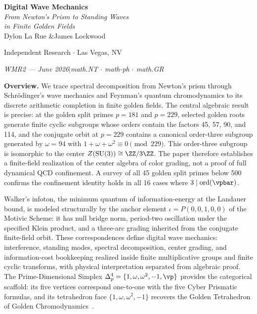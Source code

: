 

\begin{center}
\vspace*{0.5em}
{\LARGE\bfseries Digital Wave Mechanics}\\[12pt]
{\large\itshape From Newton's Prism to Standing Waves\\
in Finite Golden Fields}\\[8pt]

\vspace{1.5em}
{\large Dylon La Rue \quad\&\quad James Lockwood}

\vspace{0.5em}
{\small Independent Research $\cdot$ Las Vegas, NV}

\vspace{0.5em}
{\small\itshape WMR2 --- June 2026\quad$|$\quad math.NT $\cdot$ math-ph $\cdot$ math.GR}
\end{center}

\vspace{1em}

\vspace{1em}\noindent\textbf{Overview.}
We trace spectral decomposition from Newton's prism through Schr\"odinger's wave mechanics and Feynman's quantum chromodynamics to its discrete arithmetic completion in finite golden fields. The central algebraic result is precise: at the golden split primes $p = 181$ and $p = 229$, selected golden roots generate finite cyclic subgroups whose orders contain the factors 45, 57, 90, and 114, and the conjugate orbit at $p = 229$ contains a canonical order-three subgroup generated by $\omega = 94$ with $1 + \omega + \omega^2 \equiv 0 \pmod{229}$. This order-three subgroup is isomorphic to the center $Z(\mathrm{SU}(3)) \cong \ZZ/3\ZZ$. The paper therefore establishes a finite-field realization of the center algebra of color grading, not a proof of full dynamical QCD confinement. A survey of all 45 golden split primes below 500 confirms the confinement identity holds in all 16 cases where $3 \mid \mathrm{ord}(\vpbar)$.

Walker's infoton, the minimum quantum of information-energy at the Landauer bound, is modeled structurally by the anchor element $\iota = P(0,0,1,0,0)$ of the Motivic Scheme: it has null bridge norm, period-two oscillation under the specified Klein product, and a three-arc grading inherited from the conjugate finite-field orbit. These correspondences define digital wave mechanics: interference, standing modes, spectral decomposition, center grading, and information-cost bookkeeping realized inside finite multiplicative groups and finite cyclic transforms, with physical interpretation separated from algebraic proof. The Prime-Dimensional Simplex $\Delta^4_p = \{1, \omega, \omega^2, -1, \vp\}$ provides the categorical scaffold: its five vertices correspond one-to-one with the five Cyber Prismatic formulas, and its tetrahedron face $\{1, \omega, \omega^2, -1\}$ recovers the Golden Tetrahedron of Golden Chromodynamics~\cite{larue_chromatic}.
\vspace{1em}

